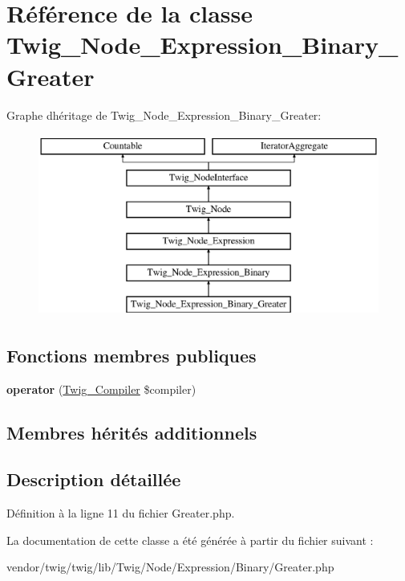 \hypertarget{class_twig___node___expression___binary___greater}{}\section{Référence de la classe Twig\+\_\+\+Node\+\_\+\+Expression\+\_\+\+Binary\+\_\+\+Greater}
\label{class_twig___node___expression___binary___greater}
Graphe d\textquotesingle{}héritage de Twig\+\_\+\+Node\+\_\+\+Expression\+\_\+\+Binary\+\_\+\+Greater\+:\begin{figure}[H]
\begin{center}
\leavevmode
\includegraphics[height=6.000000cm]{class_twig___node___expression___binary___greater}
\end{center}
\end{figure}
\subsection*{Fonctions membres publiques}
\begin{DoxyCompactItemize}
\item 
{\bfseries operator} (\hyperlink{class_twig___compiler}{Twig\+\_\+\+Compiler} \$compiler)\hypertarget{class_twig___node___expression___binary___greater_af77318ec88d5f8a508684970a150b670}{}\label{class_twig___node___expression___binary___greater_af77318ec88d5f8a508684970a150b670}

\end{DoxyCompactItemize}
\subsection*{Membres hérités additionnels}


\subsection{Description détaillée}


Définition à la ligne 11 du fichier Greater.\+php.



La documentation de cette classe a été générée à partir du fichier suivant \+:\begin{DoxyCompactItemize}
\item 
vendor/twig/twig/lib/\+Twig/\+Node/\+Expression/\+Binary/Greater.\+php\end{DoxyCompactItemize}
